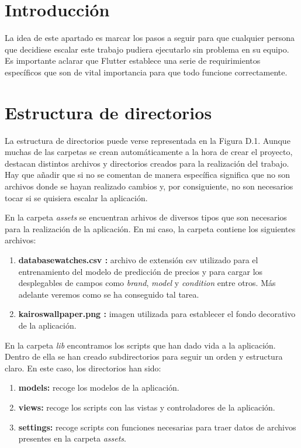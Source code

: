 
\section{Introducción}

	La idea de este apartado es marcar los pasos a seguir para que cualquier persona que decidiese escalar este trabajo pudiera ejecutarlo sin problema en su equipo. Es importante aclarar que Flutter establece una serie de requirimientos específicos que son de vital importancia para que todo funcione correctamente.

\section{Estructura de directorios}

	La estructura de directorios puede verse representada en la Figura D.1. Aunque muchas de las carpetas se crean automáticamente a la hora de crear el proyecto, destacan distintos archivos y directorios creados para la realización del trabajo. Hay que añadir que si no se comentan de manera específica significa que no son archivos donde se hayan realizado cambios y, por consiguiente, no son necesarios tocar si se quisiera escalar la aplicación.


	En la carpeta \emph{assets} se encuentran arhivos de diversos tipos que son necesarios para la realización de la aplicación. En mi caso, la carpeta contiene los siguientes archivos:
	\begin{enumerate}
		\item \textbf{databasewatches.csv :} archivo de extensión csv utilizado para el entrenamiento del modelo de predicción de precios y para cargar los desplegables de campos como \emph{brand}, \emph{model} y \emph{condition} entre otros. Más adelante veremos como se ha conseguido tal tarea.
		\item \textbf{kairoswallpaper.png :} imagen utilizada para establecer el fondo decorativo de la aplicación.
	\end{enumerate}
	
	En la carpeta \emph{lib} encontramos los scripts que han dado vida a la aplicación. Dentro de ella se han creado subdirectorios para seguir un orden y estructura claro. En este caso, los directorios han sido:
	\begin{enumerate}
		\item \textbf{models:} recoge los modelos de la aplicación.
		\item \textbf{views:} recoge los scripts con las vistas y controladores de la aplicación.
		\item \textbf{settings:} recoge scripts con funciones necesarias para traer datos de archivos presentes en la carpeta \emph{assets}.
	\end{enumerate}
	

